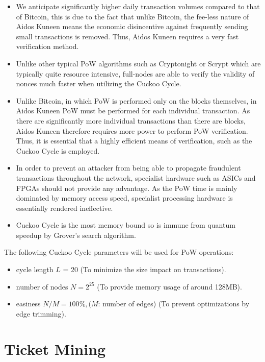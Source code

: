 \documentclass[a4paper,10pt,twocolumn]{article}
\begin{document}
	\begin{itemize}
		\setlength\itemsep{0em}
	\item We anticipate significantly higher daily transaction volumes compared to that of Bitcoin, this is due to the fact that unlike Bitcoin, the fee-less nature of Aidos Kuneen means the economic disincentive against frequently sending small transactions is removed. Thus, Aidos Kuneen requires a very fast verification method.
	\item Unlike other typical PoW algorithms such as Cryptonight or Scrypt which are typically quite resource intensive, full-nodes are able to verify the validity of nonces much faster when utilizing the Cuckoo Cycle. 
	\item Unlike Bitcoin, in which PoW is performed only on the blocks themselves, in Aidos Kuneen PoW must be performed for each individual transaction. As there are significantly more individual transactions than there are blocks, Aidos Kuneen therefore requires more power to perform PoW verification. Thus, it is essential that a highly efficient means of verification, such as the Cuckoo Cycle is employed.
	\item In order to prevent an attacker from being able to propagate fraudulent transactions throughout the network, specialist hardware such as ASICs and FPGAs should not provide any advantage. As the PoW time is mainly dominated by memory access speed, specialist processing hardware is essentially rendered ineffective.
	\item Cuckoo Cycle is the most memory bound so is immune from quantum speedup by Grover's search algorithm.
	\end{itemize}
	
	The following Cuckoo Cycle parameters will be used for PoW operations:
	
	\begin{itemize}
		\setlength\itemsep{0em}
		\item cycle length \( L\) = 20 (To minimize the size impact on transactions).
		\item number of nodes \( N = 2^{25} \) (To provide memory usage of around 128MB\@).
		\item easiness \(N/M = 100\% , (M\): number of edges) (To prevent optimizations by edge trimming).
	\end{itemize}
	
	\section{Ticket Mining}
	\label{sec:mining}
	
\end{document}

